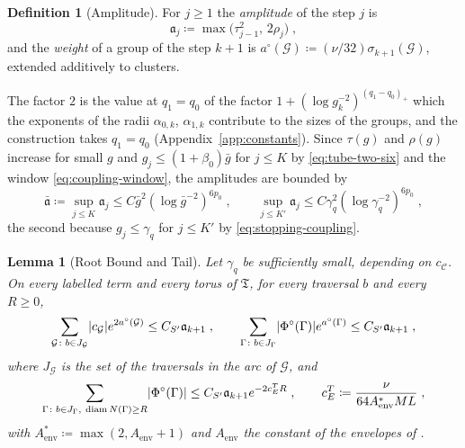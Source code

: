 \documentclass[11pt]{preprint}
\newcommand{\diam}{\operatorname{diam}}
\DeclarePairedDelimiter{\abs}{\lvert}{\rvert}
\numberwithin{equation}{section}
\newtheorem{lemma}[theorem]{Lemma}
\theoremstyle{definition}
\newtheorem{definition}[theorem]{Definition}
\theoremstyle{remark}
\theoremstyle{plain}
\begin{document}
\begin{definition}[Amplitude]\label{def:amplitude}
For $j \geq 1$ the \emph{amplitude} of the step $j$ is
\begin{equation}\label{eq:amplitude}
    \mathfrak a_j \coloneqq \max\bigl(\tau_{j-1}^2,\, 2\rho_j\bigr)\;,
\end{equation}
and the \emph{weight} of a group of the step $k + 1$ is $a^\circ(\mathcal G) \coloneqq (\nu/32)\sigma_{k+1}(\mathcal G)$, extended additively to clusters.
\end{definition}

The factor $2$ is the value at $q_1 = q_0$ of the factor $1 + (\log g_k^{-2})^{(q_1 - q_0)_+}$ which the exponents of the radii $\alpha_{0,k}$, $\alpha_{1,k}$ contribute to the sizes of the groups, and the construction takes $q_1 = q_0$ (Appendix~\ref{app:constants}). Since $\tau(g)$ and $\rho(g)$ increase for small $g$ and $g_j \leq (1 + \beta_0)\bar g$ for $j \leq K$ by \eqref{eq:tube-two-six} and the window \eqref{eq:coupling-window}, the amplitudes are bounded by
\begin{equation}\label{eq:amplitude-bound}
    \bar{\mathfrak a} \coloneqq \sup_{j \leq K}\mathfrak a_j \leq C\bar g^2(\log\bar g^{-2})^{6p_0}\;,
    \qquad
    \sup_{j \leq K'}\mathfrak a_j \leq C\gamma_q^2(\log\gamma_q^{-2})^{6p_0}\;,
\end{equation}
the second because $g_j \leq \gamma_q$ for $j \leq K'$ by \eqref{eq:stopping-coupling}.

\begin{lemma}[Root Bound and Tail]\label{lem:root-bound}
Let $\gamma_q$ be sufficiently small, depending on $c_{\mathcal C}$. On every labelled term and every torus of $\mathfrak T$, for every traversal $b$ and every $R \geq 0$,
\begin{equation}\label{eq:root-bound}
    \sum_{\mathcal G\colon b \in J_{\mathcal G}}\abs{c_{\mathcal G}}e^{2a^\circ(\mathcal G)} \leq C_{S'}\mathfrak a_{k+1}\;,
    \qquad
    \sum_{\Gamma\colon b \in J_\Gamma}\abs{\Phi^\circ(\Gamma)}e^{a^\circ(\Gamma)} \leq C_{S'}\mathfrak a_{k+1}\;,
\end{equation}
where $J_{\mathcal G}$ is the set of the traversals in the arc of $\mathcal G$, and
\begin{equation}\label{eq:cluster-tail}
    \sum_{\Gamma\colon b \in J_\Gamma,\ \diam N(\Gamma) \geq R}\abs{\Phi^\circ(\Gamma)} \leq C_{S'}\mathfrak a_{k+1}e^{-2c^T_ER}\;,
    \qquad
    c^T_E \coloneqq \frac{\nu}{64A^*_{\mathrm{env}}ML}\;,
\end{equation}
with $A^*_{\mathrm{env}} \coloneqq \max(2, A_{\mathrm{env}} + 1)$ and $A_{\mathrm{env}}$ the constant of the envelopes of \cite[Lemma~E.8]{WilsonFirstStep}.
\end{lemma}
\end{document}
